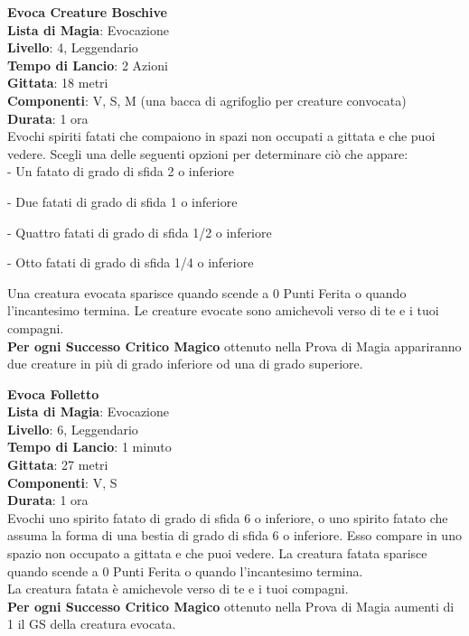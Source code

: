 \documentclass[a4paper,twoside,openany]{book}
\begin{document}
\begin{multicols}{2}
\medskip\textbf{Evoca Creature Boschive}\\
\textbf{Lista di Magia}: Evocazione\\
\textbf{Livello}: 4, Leggendario\\
\textbf{Tempo di Lancio}: 2 Azioni\\
\textbf{Gittata}: 18 metri\\
\textbf{Componenti}: V, S, M (una bacca di agrifoglio per creature convocata)\\
\textbf{Durata}: 1 ora \\
Evochi spiriti fatati che compaiono in spazi non occupati a gittata e che puoi vedere. Scegli una delle seguenti opzioni per determinare ciò che appare:\\

- Un fatato di grado di sfida 2 o inferiore

- Due fatati di grado di sfida 1 o inferiore

- Quattro fatati di grado di sfida 1/2 o inferiore

- Otto fatati di grado di sfida 1/4 o inferiore

\medskip
Una creatura evocata sparisce quando scende a 0 Punti Ferita o quando l'incantesimo termina. Le creature evocate sono amichevoli verso di te e i tuoi compagni.\\
\textbf{Per ogni Successo Critico Magico} ottenuto nella Prova di Magia appariranno due creature in più di grado inferiore od una di grado superiore.

\medskip\textbf{Evoca Folletto}\\
\textbf{Lista di Magia}: Evocazione\\
\textbf{Livello}: 6, Leggendario\\
\textbf{Tempo di Lancio}: 1 minuto\\
\textbf{Gittata}: 27 metri\\
\textbf{Componenti}: V, S\\
\textbf{Durata}: 1 ora \\
Evochi uno spirito fatato di grado di sfida 6 o inferiore, o uno spirito fatato che assuma la forma di una bestia di grado di sfida 6 o inferiore. Esso compare in uno spazio non occupato a gittata e che puoi vedere. La creatura fatata sparisce quando scende a 0 Punti Ferita o quando l'incantesimo termina.\\
La creatura fatata è amichevole verso di te e i tuoi compagni.\\
\textbf{Per ogni Successo Critico Magico} ottenuto nella Prova di Magia aumenti di 1 il GS della creatura evocata.


\end{multicols}
\end{document}
